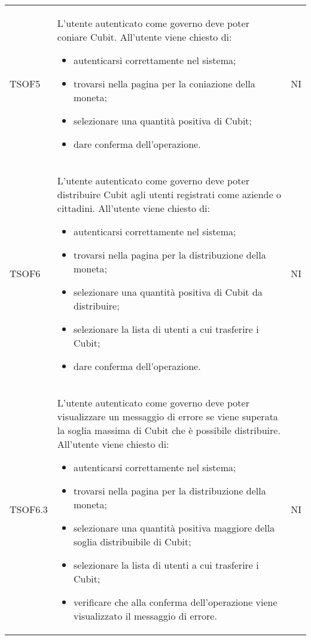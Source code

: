 \begin{longtable}{ >{\centering}p{} >{\centering}p{}
			>{\centering}p{}}
		TSOF5	&	L'utente autenticato come governo deve poter coniare Cubit.
		All'utente viene chiesto di:
		\begin{itemize}
			\item autenticarsi correttamente nel sistema;
			\item trovarsi nella pagina per la coniazione della moneta;
			\item selezionare una quantità positiva di Cubit;
			\item dare conferma dell'operazione. 
		\end{itemize}	&	NI
		\tabularnewline
		
		TSOF6	&	L'utente autenticato come governo deve poter distribuire Cubit
		agli utenti registrati come aziende o cittadini. All'utente viene chiesto di:
		\begin{itemize}
			\item autenticarsi correttamente nel sistema;
			\item trovarsi nella pagina per la distribuzione della moneta;
			\item selezionare una quantità positiva di Cubit da 
			distribuire;
			\item selezionare la lista di utenti a cui trasferire i Cubit; 
			\item dare conferma dell'operazione. 
		\end{itemize}	&	NI
		\tabularnewline
		
		TSOF6.3	&	L'utente autenticato come governo deve poter visualizzare un messaggio
		di errore se viene superata la soglia massima di Cubit che è 
		possibile distribuire. All'utente viene chiesto di:
		\begin{itemize}
			\item autenticarsi correttamente nel sistema;
			\item trovarsi nella pagina per la distribuzione della moneta;
			\item selezionare una quantità positiva maggiore della soglia distribuibile 
			di Cubit;
			\item selezionare la lista di utenti a cui trasferire i Cubit; 
			\item verificare che alla conferma dell'operazione viene visualizzato il 
			messaggio di errore.
		\end{itemize}	&	NI
	

\end{longtable}
